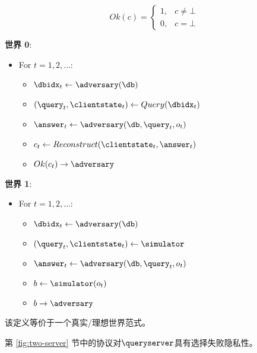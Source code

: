 $$Ok(c)=\left\{\begin{array}{ll}
        1, & c\neq \bot \\
        0, & c = \bot
    \end{array}\right.$$
\begin{mdframed}
    \begin{multicols}{2}
        \textbf{世界 0}:
        \begin{itemize}
            \item For $t=1,2,\dots$:
                  \begin{itemize}
                      \item $\dbidx_t \leftarrow \adversary(\db)$
                      \item $(\query_t,\clientstate_t) \leftarrow Query(\dbidx_t)$
                      \item $\answer_t \leftarrow \adversary(\db, \query_t, o_t)$
                      \item $c_t \leftarrow Reconstruct(\clientstate_t, \answer_t)$
                      \item $Ok(c_t) \rightarrow \adversary$
                  \end{itemize}
        \end{itemize}
        \textbf{世界 1}:
        \begin{itemize}
            \item For $t=1,2,\dots$:
                  \begin{itemize}
                      \item $\dbidx_t \leftarrow \adversary(\db)$
                      \item $(\query_t,\clientstate_t) \leftarrow \simulator$
                      \item $\answer_t \leftarrow \adversary(\db, \query_t, o_t)$
                      \item $b \leftarrow \simulator(o_t)$
                      \item $b \rightarrow \adversary$
                  \end{itemize}
        \end{itemize}
    \end{multicols}
\end{mdframed}

该定义等价于一个真实/理想世界范式。

\begin{theorem}
    第 \ref{fig:two-server} 节中的协议对$\queryserver$具有选择失败隐私性。
\end{theorem}
    

